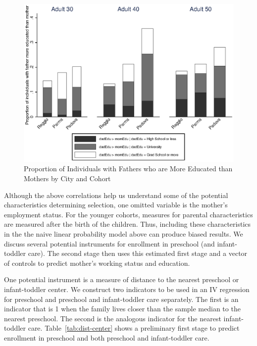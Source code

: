 \begin{figure}[!htb]
	\begin{minipage}{.9\textwidth}
	\centering
	\includegraphics[scale=1]{../../Output/image/bar_parentsEduCompare}
	\caption{Proportion of Individuals with Fathers who are More Educated than Mothers by City and Cohort}
	\label{fig:parentsEdu}
	\end{minipage}
\end{figure}

Although the above correlations help us understand some of the potential characteristics determining selection, one omitted variable is the mother's employment status. For the younger cohorts, measures for parental characteristics are measured after the birth of the children. Thus, including these characteristics in the the naive linear probability model above can produce biased results. We discuss several potential instruments for enrollment in preschool (and infant-toddler care). The second stage then uses this estimated first stage and a vector of controls to predict mother's working status and education.

One potential instrument is a measure of distance to the nearest preschool or infant-toddler center. We construct two indicators to be used in an IV regression for preschool and preschool and infant-toddler care separately. The first is an indicator that is 1 when the family lives closer than the sample median to the nearest preschool. The second is the analogous indicator for the nearest infant-toddler care. Table~\ref{tab:dist-center} shows a preliminary first stage to predict enrollment in preschool and both preschool and infant-toddler care. 

